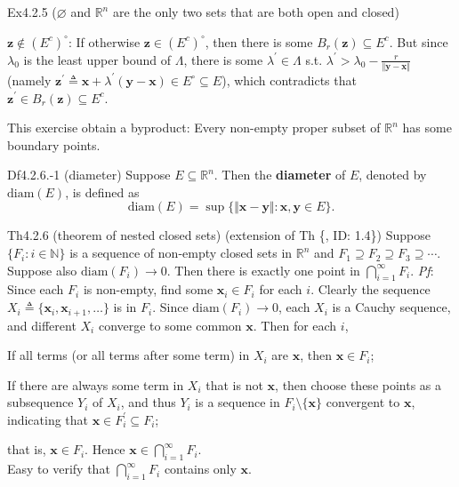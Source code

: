 \documentclass{article}
\begin{document}
\begin{Th}{Ex4.2.5 ($\varnothing$ and $\mathbb{R}^n$ are the only two sets that are both open and closed)}
\begin{compactenum}
        \item $\pmb{z}\notin (E^c)^\circ$: If otherwise $\pmb{z}\in (E^c)^\circ$, then there is some $B_r(\pmb{z})\subseteq E^c$. But since $\lambda_0$ is the least upper bound of $\Lambda$, there is some $\lambda^\prime\in\Lambda$ s.t. $\lambda^\prime>\lambda_0-\frac{r}{\Vert\pmb{y}-\pmb{x}\Vert}$ (namely $\pmb{z}^\prime \triangleq \pmb{x}+\lambda^\prime(\pmb{y}-\pmb{x})\in E^\circ\subseteq E$), which contradicts that $\pmb{z}^\prime\in B_r(\pmb{z})\subseteq E^c$.
    \end{compactenum}
\end{Th} 

\begin{Rmk}{}
    This exercise obtain a byproduct: \textcolor{Th}{Every non-empty proper subset of $\mathbb{R}^n$ has some boundary points.}
\end{Rmk}

\begin{Df}{Df4.2.6.-1 (diameter)}
    Suppose $E\subseteq\mathbb{R}^n$. Then the \textbf{diameter} of $E$, denoted by $\text{diam}(E)$, is defined as
    $$\text{diam}(E) = \sup\{\Vert\pmb{x}-\pmb{y}\Vert: \pmb{x}, \pmb{y}\in E\}.$$
\end{Df}

\begin{Th}{Th4.2.6 (theorem of nested closed sets) (extension of Th \{, ID: 1.4\})}
    Suppose $\{F_i: i\in\mathbb{N}\}$ is a sequence of non-empty closed sets in $\mathbb{R}^n$ and $F_1\supseteq F_2\supseteq F_3\supseteq \cdots$. Suppose also $\text{diam}(F_i)\rightarrow 0$. Then there is exactly one point in $\bigcap\limits_{i=1}^\infty F_i$.
    \tcblower
    \textit{Pf}: Since each $F_i$ is non-empty, find some $\pmb{x}_i\in F_i$ for each $i$. Clearly the sequence $X_i\triangleq\{\pmb{x}_i, \pmb{x}_{i+1}, \dots\}$ is in $F_i$. Since $\text{diam}(F_i)\rightarrow 0$, each $X_i$ is a Cauchy sequence, and different $X_i$ converge to some common $\pmb{x}$. Then for each $i$,
    \begin{compactenum}
        \item If all terms (or all terms after some term) in $X_i$ are $\pmb{x}$, then $\pmb{x}\in F_i$;
        \item If there are always some term in $X_i$ that is not $\pmb{x}$, then choose these points as a subsequence $Y_i$ of $X_i$, and thus $Y_i$ is a sequence in $F_i\setminus\{\pmb{x}\}$ convergent to $\pmb{x}$, indicating that $\pmb{x}\in F_i^\prime\subseteq F_i$;
    \end{compactenum}
    that is, $\pmb{x}\in F_i$. Hence $\pmb{x}\in\bigcap\limits_{i=1}^\infty F_i$.\\
    Easy to verify that $\bigcap\limits_{i=1}^\infty F_i$ contains only $\pmb{x}$.
\end{Th}
\end{document}
